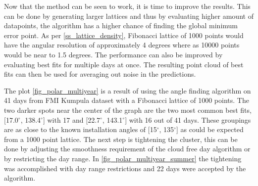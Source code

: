\noindent Now that the method can be seen to work, it is time to improve the results. This can be done by generating larger lattices and thus by evaluating higher amount of datapoints, the algorithm has a higher chance of finding the global minimum error point. As per \ref{ss_lattice_density}, Fibonacci lattice of 1000 points would have the angular resolution of approximately 4 degrees where as 10000 points would be near to 1.5 degrees. The performance can also be improved by evaluating best fits for multiple days at once. The resulting point cloud of best fits can then be used for averaging out noise in the predictions.

The plot \ref{fig_polar_multiyear} is a result of using the angle finding algorithm on 41 days from FMI Kumpula dataset with a Fibonacci lattice of 1000 points. The two darker spots near the center of the graph are the two most common best fits, [17.0$^\circ$, 138.4$^\circ$] with 17 and [22.7$^\circ$, 143.1$^\circ$] with 16 out of 41 days. These groupings are as close to the known installation angles of [15$^\circ$,  135$^\circ$] as could be expected from a 1000 point lattice. The next step is tightening the cluster, this can be done by adjusting the smoothness requirement of the cloud free day algorithm or by restricting the day range. In \ref{fig_polar_multiyear_summer} the tightening was accomplished with day range restrictions and 22 days were accepted by the algorithm.



